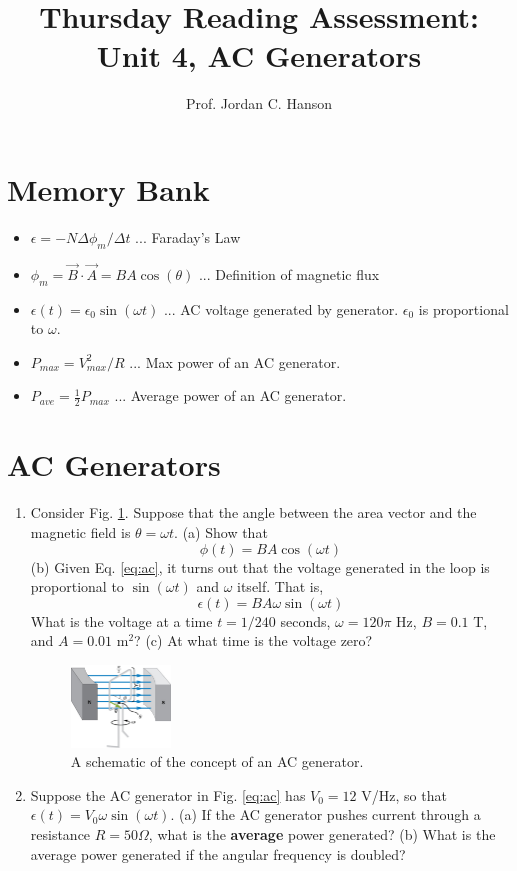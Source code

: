 \documentclass{article}
\begin{document}
\small
\title{Thursday Reading Assessment: Unit 4, AC Generators}
\author{Prof. Jordan C. Hanson}

\maketitle

\section{Memory Bank}

\begin{itemize}
\item $\epsilon = -N \Delta \phi_m /\Delta t$ ... Faraday's Law
\item $\phi_m = \vec{B} \cdot \vec{A} = BA \cos(\theta)$ ... Definition of magnetic flux
\item $\epsilon(t) = \epsilon_0 \sin(\omega t)$ ... AC voltage generated by generator.  $\epsilon_0$ is proportional to $\omega$.
\item $P_{max} = V_{max}^2/R$ ... Max power of an AC generator.
\item $P_{ave} = \frac{1}{2} P_{max}$ ... Average power of an AC generator.
\end{itemize}

\section{AC Generators}

\begin{enumerate}
\item Consider Fig. \ref{fig:acgen}.  Suppose that the angle between the area vector and the magnetic field is $\theta = \omega t$.  (a) Show that
\begin{equation}
\phi(t) = BA\cos(\omega t) \label{eq:ac}
\end{equation}
(b) Given Eq. \ref{eq:ac}, it turns out that the voltage generated in the loop is proportional to $\sin(\omega t)$ and $\omega$ itself.  That is,
\begin{equation}
\epsilon(t) = BA\omega \sin(\omega t)
\end{equation}
What is the voltage at a time $t = 1/240$ seconds, $\omega = 120\pi$ Hz, $B = 0.1$ T, and $A = 0.01$ m$^2$? (c) At what time is the voltage zero?
\begin{figure}[hb]
\centering
\includegraphics[width=0.25\textwidth]{acGen.jpeg}
\caption{\label{fig:acgen} A schematic of the concept of an AC generator.}
\end{figure}
\item Suppose the AC generator in Fig. \ref{eq:ac} has $V_0 = 12$ V/Hz, so that $\epsilon(t) = V_0 \omega \sin(\omega t)$.  (a) If the AC generator pushes current through a resistance $R = 50\Omega$, what is the \textbf{average} power generated? (b) What is the average power generated if the angular frequency is doubled?
\end{enumerate}
\end{document}
